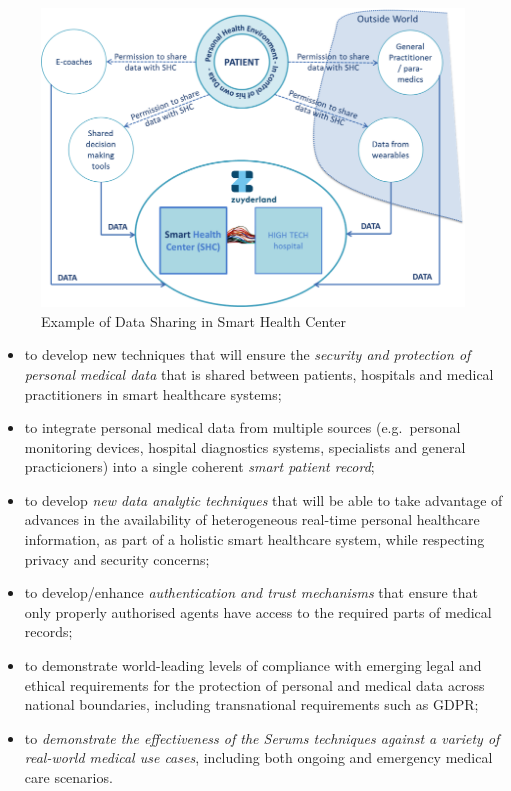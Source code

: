 \documentclass[sigconf]{acmart}
\begin{document}
\begin{figure}
  \centering
  \includegraphics[width=\columnwidth]{SmartHealthCentre.png}
  \caption{Example of Data Sharing in Smart Health Center}
  \label{fig:smartcentre}
\end{figure}
    
\begin{itemize}
\item to develop new techniques that will ensure the \emph{security and protection of personal medical data} that is shared between patients, hospitals and medical practitioners in smart healthcare systems;
\item to integrate personal medical data from multiple sources (e.g.~personal monitoring devices, hospital diagnostics systems, specialists and general practicioners) into a single coherent \emph{smart patient record};
\item to develop \emph{new data analytic techniques} that will be able to take advantage of advances in the availability of heterogeneous real-time personal healthcare information, as part of a holistic smart healthcare system, while respecting privacy and security concerns;
\item to develop/enhance \emph{authentication and trust mechanisms} that ensure that only properly authorised agents have access to the required parts of medical records;
\item to demonstrate world-leading levels of compliance with emerging legal and ethical requirements for the protection of personal and medical data across national boundaries, including transnational requirements such as GDPR;
\item to \emph{demonstrate the effectiveness of the Serums techniques against a variety of real-world medical use cases}, including both ongoing and emergency medical care scenarios.
\end{itemize}
\end{document}

